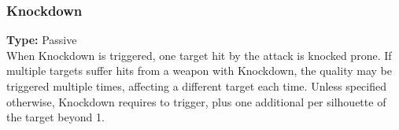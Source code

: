 \subsubsection{Knockdown}
\label{iqty:knockdown}
\textbf{Type:} Passive\\
When Knockdown is triggered, one target hit by the
attack is knocked prone. If multiple targets suffer hits
from a weapon with Knockdown, the quality may be triggered
multiple times, affecting a different target each time.
Unless specified otherwise, Knockdown requires \advantage
\advantage to trigger, plus one additional \advantage per
silhouette of the target beyond 1.
